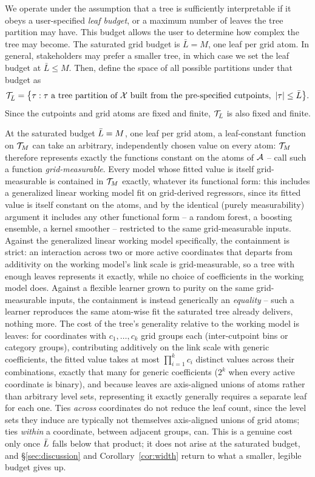 \documentclass[12pt]{article}
\begin{document}
We operate under the assumption that a tree is sufficiently interpretable if it obeys a user-specified \emph{leaf budget}, or a maximum number of leaves the tree partition may have. This budget allows the user to determine how complex the tree may become. The saturated grid budget is $\bar L = M$, one leaf per grid atom. In general, stakeholders may prefer a smaller tree, in which case we set the leaf budget at $\bar L \leq M$. Then, define the space of all possible partitions under that budget as
\[
  \mathcal{T}_{\bar L}=\bigl\{\tau:\tau\text{ a tree partition of }\mathcal{X}\text{ built
  from the pre-specified cutpoints},\
  \left|\tau\right|\le\bar L\bigr\}.
\]
Since the cutpoints and grid atoms are fixed and finite, $\mathcal{T}_{\bar L}$ is also fixed and finite.

\begin{remark}[The saturated class is representationally maximal]
\label{rem:saturated-general}
At the saturated budget $\bar{L}=M$, one leaf per grid atom, a leaf-constant function on $\mathcal{T}_M$ can take an arbitrary, independently chosen value on every atom: $\mathcal{T}_M$ therefore represents exactly the functions constant on the atoms of $\mathcal{A}$ -- call such a function \emph{grid-measurable}. Every model whose fitted value is itself grid-measurable is contained in $\mathcal{T}_M$ exactly, whatever its functional form: this includes a generalized linear working model fit on grid-derived regressors, since its fitted value is itself constant on the atoms, and by the identical (purely measurability) argument it includes any other functional form -- a random forest, a boosting ensemble, a kernel smoother -- restricted to the same grid-measurable inputs. Against the generalized linear working model specifically, the containment is strict: an interaction across two or more active coordinates that departs from additivity on the working model's link scale is grid-measurable, so a tree with enough leaves represents it exactly, while no choice of coefficients in the working model does. Against a flexible learner grown to purity on the same grid-measurable inputs, the containment is instead generically an \emph{equality} -- such a learner reproduces the same atom-wise fit the saturated tree already delivers, nothing more. The cost of the tree's generality relative to the working model is leaves: for coordinates with $c_1,\ldots,c_k$ grid groups each (inter-cutpoint bins or category groups), contributing additively on the link scale with generic coefficients, the fitted value takes at most $\prod_{i=1}^k c_i$ distinct values across their combinations, exactly that many for generic coefficients ($2^k$ when every active coordinate is binary), and because leaves are axis-aligned unions of atoms rather than arbitrary level sets, representing it exactly generally requires a separate leaf for each one. Ties \emph{across} coordinates do not reduce the leaf count, since the level sets they induce are typically not themselves axis-aligned unions of grid atoms; ties \emph{within} a coordinate, between adjacent groups, can. This is a genuine cost only once $\bar{L}$ falls below that product; it does not arise at the saturated budget, and \S\ref{sec:discussion} and Corollary~\ref{cor:width} return to what a smaller, legible budget gives up.
\end{remark}
\end{document}
